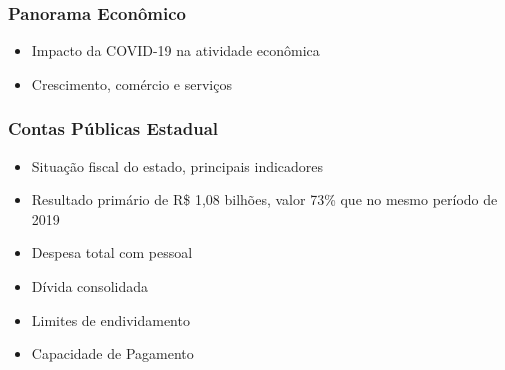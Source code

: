 \documentclass[12pt,aspectratio=169]{beamer}
\begin{document}
\begin{frame}
    \frametitle{Panorama Econômico}
    \begin{itemize}
        \item Impacto da COVID-19 na atividade econômica
        \item Crescimento, comércio e serviços
    \end{itemize}

	\begin{figure}%
		\centering
		\qquad
	\end{figure}
\end{frame}

\begin{frame}
	\frametitle{Contas Públicas Estadual}
	\begin{itemize}
		\item Situação fiscal do estado, principais indicadores
		\item Resultado primário de R\$ 1,08 bilhões, valor 73\% que no mesmo período de 2019
		\item Despesa total com pessoal
		\item Dívida consolidada
		\item Limites de endividamento
		\item Capacidade de Pagamento
	\end{itemize}
\end{frame}
\end{document}
